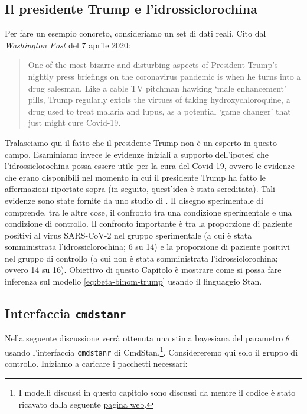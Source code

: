 \documentclass[
]{memoir}
\begin{document}
\hypertarget{il-presidente-trump-e-lidrossiclorochina}{%
\subsection{Il presidente Trump e l'idrossiclorochina}\label{il-presidente-trump-e-lidrossiclorochina}}

Per fare un esempio concreto, consideriamo un set di dati reali. Cito dal \emph{Washington Post} del 7 aprile 2020:

\begin{quote}
One of the most bizarre and disturbing aspects of President Trump's nightly press briefings on the coronavirus pandemic is when he turns into a drug salesman. Like a cable TV pitchman hawking `male enhancement' pills, Trump regularly extols the virtues of taking hydroxychloroquine, a drug used to treat malaria and lupus, as a potential `game changer' that just might cure Covid-19.
\end{quote}

Tralasciamo qui il fatto che il presidente Trump non è un esperto in questo campo. Esaminiamo invece le evidenze iniziali a supporto dell'ipotesi che l'idrossiclorochina possa essere utile per la cura del Covid-19, ovvero le evidenze che erano disponibili nel momento in cui il presidente Trump ha fatto le affermazioni riportate sopra (in seguito, quest'idea è stata screditata). Tali evidenze sono state fornite da uno studio di \citet{Gautret_2020}.
Il disegno sperimentale di \citet{Gautret_2020} comprende, tra le altre cose, il confronto tra una condizione sperimentale e una condizione di controllo. Il confronto importante è tra la proporzione di paziente positivi al virus SARS-CoV-2 nel gruppo sperimentale (a cui è stata somministrata l'idrossiclorochina; 6 su 14) e la proporzione di paziente positivi nel gruppo di controllo (a cui non è stata somministrata l'idrossiclorochina; ovvero 14 su 16). Obiettivo di questo Capitolo è mostrare come si possa fare inferenza sul modello \eqref{eq:beta-binom-trump} usando il linguaggio Stan.

\hypertarget{cmdstanr-gautret}{%
\subsection{\texorpdfstring{Interfaccia \texttt{cmdstanr}}{Interfaccia cmdstanr}}\label{cmdstanr-gautret}}

Nella seguente discussione verrà ottenuta una stima bayesiana del parametro \(\theta\) usando l'interfaccia \texttt{cmdstanr} di CmdStan.\footnote{I modelli discussi in questo capitolo sono discussi da \citet{gelman1995bayesian} mentre il codice è stato ricavato dalla seguente \href{http://avehtari.github.io/BDA_R_demos/demos_rstan/rstan_demo.html}{pagina web}.}. Considereremo qui solo il gruppo di controllo. Iniziamo a caricare i pacchetti necessari:
\end{document}
